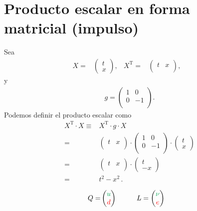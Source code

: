 \documentclass[11pt,a4paper]{book}
\begin{document}
\section{Producto escalar en forma matricial (impulso)}
Sea 
\begin{align*}
    X =& \begin{pmatrix}
        t\\  
        x
    \end{pmatrix},&
    X^{\operatorname{T}} =& 
    \begin{pmatrix}
        t&x\\
    \end{pmatrix},&
\end{align*}
y
\begin{align*}
    g = \begin{pmatrix}
        1 & 0\\
        0 & -1\\
    \end{pmatrix}.
\end{align*}
Podemos definir el producto escalar como
\begin{align*}
    X^{\operatorname{T}}\cdot X 
   \equiv & X^{\operatorname{T}}\cdot g \cdot X \\
   = &\begin{pmatrix}
        t&x\\
    \end{pmatrix}\cdot  \begin{pmatrix}
        1 & 0\\
        0 & -1\\
    \end{pmatrix} \cdot \begin{pmatrix}
        t\\  
        x
    \end{pmatrix} \\
   = &\begin{pmatrix}
        t&x\\
    \end{pmatrix}\cdot \begin{pmatrix}
        t\\  
        -x
    \end{pmatrix} \\
= & t^2 - x ^2\,.
\end{align*}




\begin{align*}
    Q =&\begin{pmatrix}
      \color{Green}  u\\
       \color{red} d
    \end{pmatrix} \hspace{1cm}
    L= \begin{pmatrix}
      \color{Green}  \nu\\
       \color{red} e
    \end{pmatrix}
\end{align*}
\end{document}
